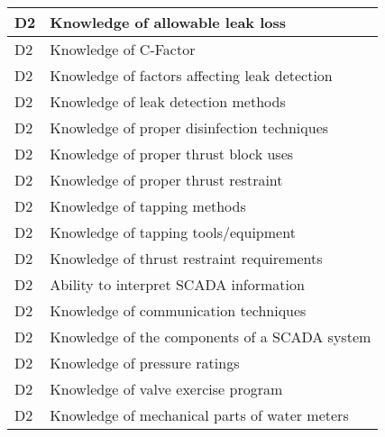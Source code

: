 \begin{table}[H]
\begin{tabular}{| m{1cm} |m{15cm} |}
D2 & Knowledge of   allowable leak loss                                                                             \\ \hline
D2 & Knowledge of C-Factor                                                                                          \\ \hline
D2 & Knowledge of factors   affecting leak detection                                                                \\ \hline
D2 & Knowledge of leak   detection methods                                                                          \\ \hline
D2 & Knowledge of proper   disinfection techniques                                                                  \\ \hline
D2 & Knowledge of proper   thrust block uses                                                                        \\ \hline
D2 & Knowledge of proper   thrust restraint                                                                         \\ \hline
D2 & Knowledge of tapping   methods                                                                                 \\ \hline
D2 & Knowledge of tapping   tools/equipment                                                                         \\ \hline
D2 & Knowledge of thrust   restraint requirements                                                                   \\ \hline
D2 & Ability to interpret   SCADA information                                                                       \\ \hline
D2 & Knowledge of   communication techniques                                                                        \\ \hline
D2 & Knowledge of the   components of a SCADA system                                                                \\ \hline
D2 & Knowledge of pressure   ratings                                                                                \\ \hline
D2 & Knowledge of valve   exercise program                                                                          \\ \hline
D2 & Knowledge of   mechanical parts of water meters                                                                \\ \hline

\end{tabular}
\end{table}
